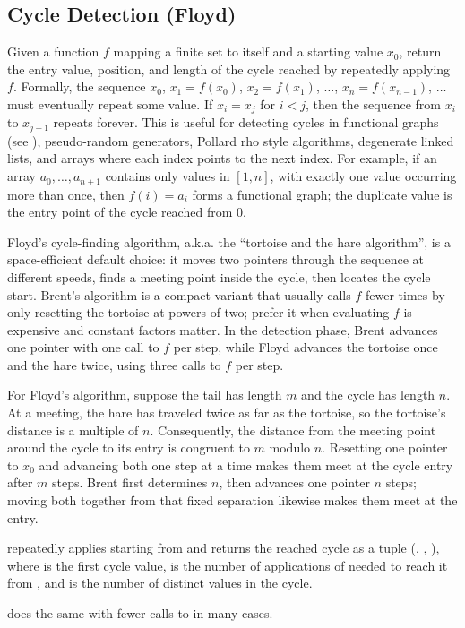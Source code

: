 \subsection{Cycle Detection (Floyd)}
\label{sec:1.8.4}
Given a function $f$ mapping a finite set to itself and a starting value $x_0$, return the entry value, position, and length of the cycle reached by repeatedly applying $f$. Formally, the sequence $x_0$, $x_1 = f(x_0)$, $x_2 = f(x_1)$, $\ldots$, $x_n = f(x_{n - 1})$, $\ldots$ must eventually repeat some value. If $x_i = x_j$ for $i < j$, then the sequence from $x_i$ to $x_{j - 1}$ repeats forever. This is useful for detecting cycles in functional graphs (see ), pseudo-random generators, Pollard rho style algorithms, degenerate linked lists, and arrays where each index points to the next index. For example, if an array $a_0, \ldots, a_{n+1}$ contains only values in $[1, n]$, with exactly one value occurring more than once, then $f(i) = a_i$ forms a functional graph; the duplicate value is the entry point of the cycle reached from $0$.

Floyd's cycle-finding algorithm, a.k.a. the ``tortoise and the hare algorithm'', is a space-efficient default choice: it moves two pointers through the sequence at different speeds, finds a meeting point inside the cycle, then locates the cycle start. Brent's algorithm is a compact variant that usually calls $f$ fewer times by only resetting the tortoise at powers of two; prefer it when evaluating $f$ is expensive and constant factors matter. In the detection phase, Brent advances one pointer with one call to $f$ per step, while Floyd advances the tortoise once and the hare twice, using three calls to $f$ per step.

For Floyd's algorithm, suppose the tail has length $m$ and the cycle has length $n$. At a meeting, the hare has traveled twice as far as the tortoise, so the tortoise's distance is a multiple of $n$. Consequently, the distance from the meeting point around the cycle to its entry is congruent to $m$ modulo $n$. Resetting one pointer to $x_0$ and advancing both one step at a time makes them meet at the cycle entry after $m$ steps. Brent first determines $n$, then advances one pointer $n$ steps; moving both together from that fixed separation likewise makes them meet at the entry.

\begin{compactitem}
  \item {} repeatedly applies  starting from  and returns the reached cycle as a tuple (, , ), where  is the first cycle value,  is the number of applications of  needed to reach it from , and  is the number of distinct values in the cycle.
  \item {} does the same with fewer calls to  in many cases.
\end{compactitem}

